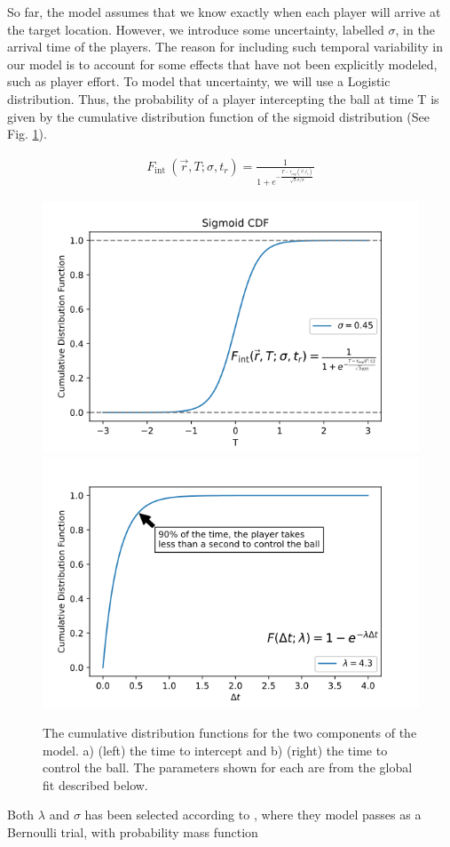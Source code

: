 \documentclass[
  10pt,
  twoside,nohyper]{book}
\begin{document}
So far, the model assumes that we know exactly when each player will arrive at the target location. However, we introduce some uncertainty, labelled \(\sigma\), in the arrival time of the players. The reason for including such temporal variability in our model is to account for some effects that have not been explicitly modeled, such as player effort. To model that uncertainty, we will use a Logistic distribution. Thus, the probability of a player intercepting the ball at time T is given by the cumulative distribution function of the sigmoid distribution \autocite{SpearmanFit} (See Fig. \ref{fig:lambda}).

\begin{align*}
    F_{\text {int }}(\vec{r},T;\sigma, t_r)=\frac{1}{1+e^{-\frac{T- \tau_{exp}(\vec{r} ; t_r)}{\sqrt{3} \sigma / \pi}}}
\end{align*}

\begin{figure}[H]

{\centering \includegraphics[width=0.45\linewidth,]{imagenes/sigmoid_poster} \includegraphics[width=0.45\linewidth,]{imagenes/exp_poster} 

}

\caption{The cumulative distribution functions for the two components of the model. a) (left) the time to intercept and b) (right) the time to control the ball.    The parameters shown for each are from the global fit described below.}\label{fig:lambda}
\end{figure}

Both \(\lambda\) and \(\sigma\) has been selected according to \autocite{SpearmanFit}, where they model passes as a Bernoulli trial, with probability mass function
\end{document}
